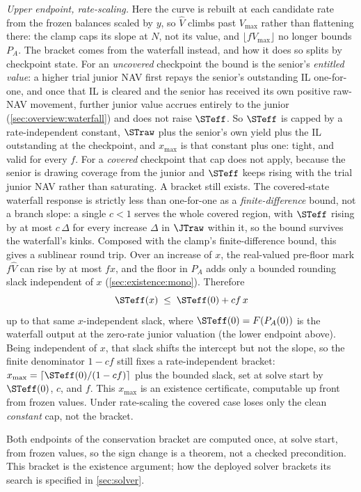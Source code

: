 \emph{Upper endpoint, rate-scaling.} Here the curve is rebuilt at each
candidate rate from the frozen balances scaled by $y$, so $\widehat V$
climbs past $V_{\max}$ rather than flattening there: the clamp caps its
slope at $N$, not its value, and $\lfloor f V_{\max}\rfloor$ no longer
bounds $P_A$. The bracket comes from the waterfall instead, and how it
does so splits by checkpoint state. For an
\emph{uncovered} checkpoint the bound is the senior's \emph{entitled
value}: a higher trial junior NAV first repays the senior's outstanding
IL one-for-one, and once that IL is cleared and the senior has received
its own positive raw-NAV movement, further junior value accrues entirely
to the junior (\cref{sec:overview:waterfall}) and does not raise
$\STeff$. So $\STeff$ is capped by a rate-independent constant, $\STraw$
plus the senior's own yield plus the IL outstanding at the checkpoint,
and $x_{\max}$ is that constant plus one: tight, and valid for every $f$.
For a \emph{covered} checkpoint that cap does not apply, because the
senior is drawing coverage from the junior and $\STeff$ keeps rising with
the trial junior NAV rather than saturating. A bracket still exists. The
covered-state waterfall response is strictly less than one-for-one as a
\emph{finite-difference} bound, not a branch slope: a single $c < 1$
serves the whole covered region, with $\STeff$ rising by at most
$c\,\Delta$ for every increase $\Delta$ in $\JTraw$ within it, so the
bound survives the waterfall's kinks. Composed with the clamp's
finite-difference bound, this gives a sublinear round trip. Over an
increase of $x$, the real-valued pre-floor mark $f\widehat V$ can rise
by at most $f x$, and the floor in $P_A$ adds only a bounded rounding
slack independent of $x$ (\cref{sec:existence:mono}). Therefore
\[
  \STeff(x) \;\leq\; \STeff(0) + c f\,x
\]
up to that same $x$-independent slack, where $\STeff(0) = F(P_A(0))$ is
the waterfall output at the zero-rate junior valuation (the lower
endpoint above). Being independent of $x$, that slack shifts the
intercept but not the slope, so the finite
denominator $1 - c f$ still fixes a rate-independent bracket:
$x_{\max} = \lceil \STeff(0)/(1 - c f)\rceil$ plus the bounded slack, set
at solve start by $\STeff(0)$, $c$, and $f$. This $x_{\max}$ is an
existence certificate, computable up front from frozen values. Under
rate-scaling the covered case loses only the clean \emph{constant} cap,
not the bracket.

Both endpoints of the conservation bracket are computed once, at solve
start, from frozen values, so the sign change is a theorem, not a checked
precondition. This bracket is the existence argument; how the deployed
solver brackets its search is specified in \cref{sec:solver}.

